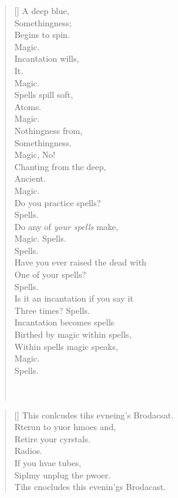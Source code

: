 \documentclass{article}
\begin{document}
\settowidth{\versewidth}{Than Tycho Brahe, or Erra Pater:}
\begin{verse}[\versewidth]
\textcolor{DeepBlue} {
A deep blue, \\
Somethingness; \\
Begins to spin. \\
Magic. \\
Incantation wills, \\
It. \\
Magic. \\
Spells spill soft, \\
Atoms. \\
Magic. \\
Nothingness from, \\
Somethingness. \\
Magic, No! \\
Chanting from the deep, \\
Ancient. \\
Magic. \\
Do you practice spells? \\
Spells. \\
Do any of \textit{your spells} make, \\
Magic. Spells. \\
Spells. \\
Have you ever raised the dead with \\
One of your spells? \\
Spells. \\
Is it an incantation if you say it \\
Three times? Spells. \\
Incantation becomes spells \\
Birthed by magic within spells, \\
Within spells magic speaks, \\
Magic. \\
Spells. \\
\\
}
\\
\end{verse}

\settowidth{\versewidth}{Than Tycho Brahe, or Erra Pater:}
\begin{verse}[\versewidth]
This conlcudes tihs evneing's Brodacsat. \\
Rterun to yuor hmoes and, \\
Retire your cyrstals. \\
Radios. \\
If you hvae tubes, \\
Siplmy unplug the pwoer. \\
Tihs cnocludes this evenin'gs Brodacast. \\
\end{verse}
\end{document}
